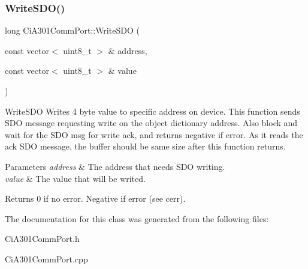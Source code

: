 \subsubsection{\texorpdfstring{Write\+S\+D\+O()}{WriteSDO()}}
{\footnotesize\ttfamily long Ci\+A301\+Comm\+Port\+::\+Write\+S\+DO (\begin{DoxyParamCaption}\item[{const vector$<$ uint8\+\_\+t $>$ \&}]{address,  }\item[{const vector$<$ uint8\+\_\+t $>$ \&}]{value }\end{DoxyParamCaption})}



Write\+S\+DO Writes 4 byte value to specific address on device. This function sends S\+DO message requesting write on the object dictionary address. Also block and wait for the S\+DO msg for write ack, and returns negative if error. As it reads the ack S\+DO message, the buffer should be same size after this function returns. 


\begin{DoxyParams}{Parameters}
{\em address} & The address that needs S\+DO writing. \\
\hline
{\em value} & The value that will be writed. \\
\hline
\end{DoxyParams}
\begin{DoxyReturn}{Returns}
0 if no error. Negative if error (see cerr). 
\end{DoxyReturn}


The documentation for this class was generated from the following files\+:\begin{DoxyCompactItemize}
\item 
Ci\+A301\+Comm\+Port.\+h\item 
Ci\+A301\+Comm\+Port.\+cpp\end{DoxyCompactItemize}
